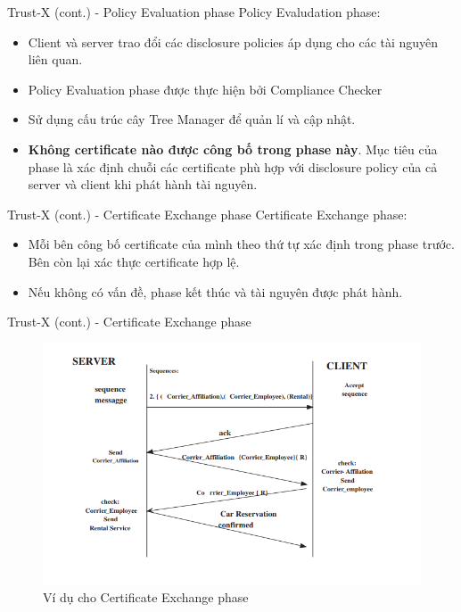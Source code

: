 \documentclass[11pt]{beamer}
\begin{document}
\begin{frame}{Trust-X (cont.) - Policy Evaluation phase}
Policy Evaludation phase:
\begin{itemize}
\item Client và server trao đổi các disclosure policies áp dụng cho các tài nguyên liên quan.
\item Policy Evaluation phase được thực hiện bởi Compliance Checker
\item Sử dụng cấu trúc cây Tree Manager để quản lí và cập nhật.
\item \textbf{Không certificate nào được công bố trong phase này}. Mục tiêu của phase là xác định chuỗi các certificate phù hợp với disclosure policy của cả server và client khi phát hành tài nguyên.
\end{itemize}
\end{frame}

\begin{frame}{Trust-X (cont.) - Certificate Exchange phase}
Certificate Exchange phase:
\begin{itemize}
\item Mỗi bên công bố certificate của mình theo thứ tự xác định trong phase trước. Bên còn lại xác thực certificate hợp lệ.
\item Nếu không có vấn đề, phase kết thúc và tài nguyên được phát hành.
\end{itemize}
\end{frame}

\begin{frame}{Trust-X (cont.) - Certificate Exchange phase}
\begin{figure}
\centering
\includegraphics[scale=.5]{img/cert-exchange.PNG}
\caption{Ví dụ cho Certificate Exchange phase}
\label{fig:cert-exchange}
\end{figure}
\end{frame}
\end{document}
